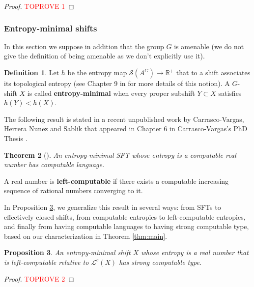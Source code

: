\documentclass[french,american]{article}
\theoremstyle{plain}
\newtheorem{theorem}{Theorem}[section]
\newtheorem{proposition}[theorem]{Proposition}
\theoremstyle{definition}
\newtheorem{definition}[theorem]{Definition}
\theoremstyle{remark}
\theoremstyle{plain}
\begin{document}
\begin{proof}\textcolor{red}{TOPROVE 1}\end{proof}



\subsubsection{Entropy-minimal shifts}\label{subsec:Entropy-minimal-subshifts}

In this section we suppose in addition that the group $G$ is amenable
(we do not give the definition of being amenable as we don't explicitly
use it).
\begin{definition}
\label{def:hentropyminimal}Let $h$ be the entropy
map $\mathcal{S}(A^{G})\rightarrow\mathbb{R}^+$ that to a shift
associates its topological entropy (see Chapter 9 in \cite{kerr2017ergodic}
for more details of this notion). A $G$-shift
$X$ is called \textbf{entropy-minimal}
when every proper subshift $Y\subset X$ satisfies $h(Y)<h(X)$.
\end{definition}

The following result is stated in a recent unpublished work by Carrasco-Vargas,
Herrera Nunez and Sablik that appeared in Chapter 6 in Carrasco-Vargas's PhD
Thesis \cite{Phdnicanor2024}.
\begin{theorem}[\cite{Phdnicanor2024}]
An entropy-minimal SFT whose entropy is a computable real number
has computable language.
\end{theorem}

A real number is \textbf{left-computable} if there exists a computable
increasing sequence of rational numbers converging to it.

In Proposition \ref{prop:An-entropy-minimal-subshift}, we generalize
this result in several ways: from SFTs to effectively closed shifts, from computable entropies to left-computable entropies, and finally from having computable languages to having strong computable type, based on our characterization in Theorem \ref{thm:main}.
\begin{proposition}
\label{prop:An-entropy-minimal-subshift}An entropy-minimal shift $X$
whose entropy is a real number that is left-computable relative to $\mathcal L^c(X)$ has strong computable
type.
\end{proposition}

\begin{proof}\textcolor{red}{TOPROVE 2}\end{proof}
\end{document}
